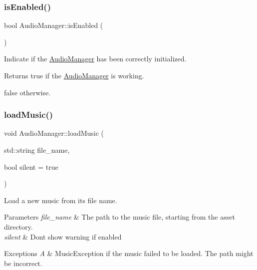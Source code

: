 \subsubsection{\texorpdfstring{is\+Enabled()}{isEnabled()}}
{\footnotesize\ttfamily bool Audio\+Manager\+::is\+Enabled (\begin{DoxyParamCaption}{ }\end{DoxyParamCaption})\hspace{0.3cm}{\ttfamily [static]}}



Indicate if the \hyperlink{class_audio_manager}{Audio\+Manager} has been correctly initialized. 

\begin{DoxyReturn}{Returns}
true if the \hyperlink{class_audio_manager}{Audio\+Manager} is working. 

false otherwise. 
\end{DoxyReturn}
\mbox{\label{class_audio_manager_a3bb15b3e23faa7ddd6ccd39da27d8484}} 
\subsubsection{\texorpdfstring{load\+Music()}{loadMusic()}}
{\footnotesize\ttfamily void Audio\+Manager\+::load\+Music (\begin{DoxyParamCaption}\item[{std\+::string}]{file\+\_\+name,  }\item[{bool}]{silent = {\ttfamily true} }\end{DoxyParamCaption})\hspace{0.3cm}{\ttfamily [static]}}



Load a new music from its file name. 


\begin{DoxyParams}{Parameters}
{\em file\+\_\+name} & The path to the music file, starting from the asset directory. \\
\hline
{\em silent} & Don\textquotesingle{}t show warning if enabled\\
\hline
\end{DoxyParams}

\begin{DoxyExceptions}{Exceptions}
{\em A} & Music\+Exception if the music failed to be loaded. The path might be incorrect. \\
\hline
\end{DoxyExceptions}
\mbox{\label{class_audio_manager_a6a0b83c130c022c7557bcc4edb7c59d8}} 
